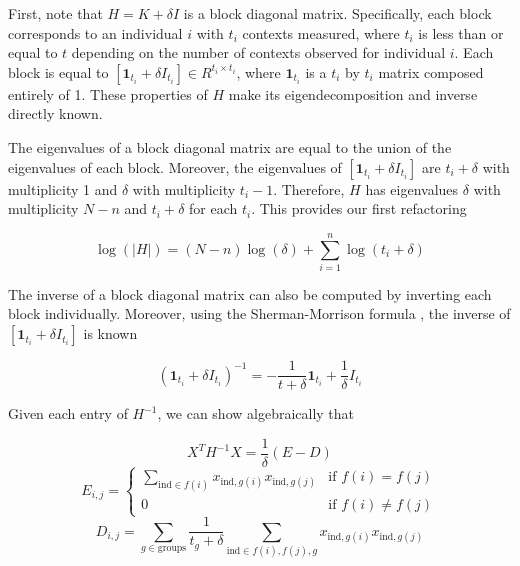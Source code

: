         First, note that $H = K + \delta I$ is a block diagonal matrix. Specifically, each block corresponds to an individual $i$ with $t_i$ contexts measured, where $t_i$ is less than or equal to $t$ depending on the number of contexts observed for individual $i$. Each block is equal to $[\mathbf{1}_{t_i} + \delta I_{t_i}] \in R^{t_i \times t_i}$, where $\mathbf{1}_{t_i}$ is a $t_i$ by $t_i$ matrix composed entirely of 1. These properties of $H$ make its eigendecomposition and inverse directly known.
        
        The eigenvalues of a block diagonal matrix are equal to the union of the eigenvalues of each block. Moreover, the eigenvalues of $[\mathbf{1}_{t_i} + \delta I_{t_i}]$ are $t_i + \delta$ with multiplicity 1 and $\delta$ with multiplicity $t_i - 1$. Therefore, $H$ has eigenvalues $\delta$ with multiplicity $N-n$ and $t_i + \delta$ for each $t_i$. This provides our first refactoring
        
        \begin{equation}
            \log{(|H|)} = (N-n)\log{(\delta)} + \sum_{i=1}^n \log{(t_i + \delta)}
        \end{equation}
        
        The inverse of a block diagonal matrix can also be computed by inverting each block individually. Moreover, using the Sherman-Morrison formula \cite{ShermanMorrison}, the inverse of $[\mathbf{1}_{t_i} + \delta I_{t_i}]$ is known
        
        \begin{equation}
            (\mathbf{1}_{t_i} + \delta I_{t_i})^{-1} =  -\frac{1}{t+\delta}\mathbf{1}_{t_i} + \frac{1}{\delta} I_{t_i}
        \end{equation}
        
        \noindent Given each entry of $H^{-1}$, we can show algebraically that
        
        \begin{equation}
            X^T H^{-1} X = \frac{1}{\delta}(E - D)
        \end{equation}
        \begin{equation}
            E_{i,j} = 
            \begin{cases} 
                \sum\limits_{\text{ind} \in f(i)} x_{\text{ind},g(i)}x_{\text{ind},g(j)}&\mbox{if } f(i) = f(j) \\
                0 & \mbox{if } f(i) \neq f(j)
            \end{cases}
        \end{equation}
        \begin{equation}
            D_{i,j} = \sum\limits_{g \in \text{groups}} \frac{1}{t_g + \delta} \sum\limits_{\text{ind} \in f(i),f(j),g}x_{\text{ind},g(i)}x_{\text{ind},g(j)}
        \end{equation}
        
